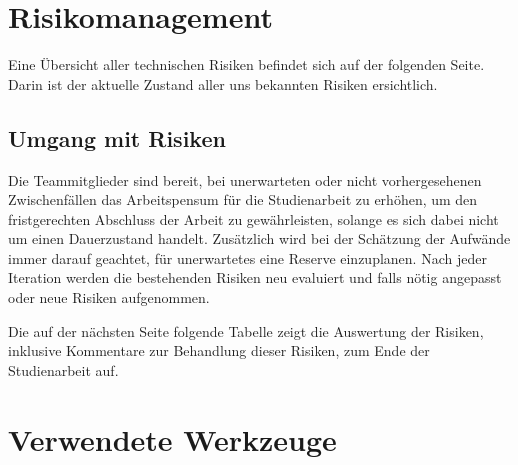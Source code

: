 \documentclass[12pt, a4paper]{report}
\begin{document}
	
	
	
	
	\chapter{Risikomanagement}
	Eine Übersicht aller technischen Risiken befindet sich auf der folgenden Seite. Darin ist der aktuelle Zustand aller uns bekannten Risiken ersichtlich.
	
	\section{Umgang mit Risiken}
	Die Teammitglieder sind bereit, bei unerwarteten oder nicht vorhergesehenen Zwischenfällen das Arbeitspensum für die Studienarbeit zu erhöhen, um den fristgerechten Abschluss der Arbeit zu gewährleisten, solange es sich dabei nicht um einen Dauerzustand handelt. Zusätzlich wird bei der Schätzung der Aufwände immer darauf geachtet, für unerwartetes eine Reserve einzuplanen.
	Nach jeder Iteration werden die bestehenden Risiken neu evaluiert und falls nötig angepasst oder neue Risiken aufgenommen.
	
	Die auf der nächsten Seite folgende Tabelle zeigt die Auswertung der Risiken, inklusive Kommentare zur Behandlung dieser Risiken, zum Ende der Studienarbeit auf.
	
	 

	\chapter{Verwendete Werkzeuge}
	\label{chap:werkzeuge}
	
	
	
\end{document}
